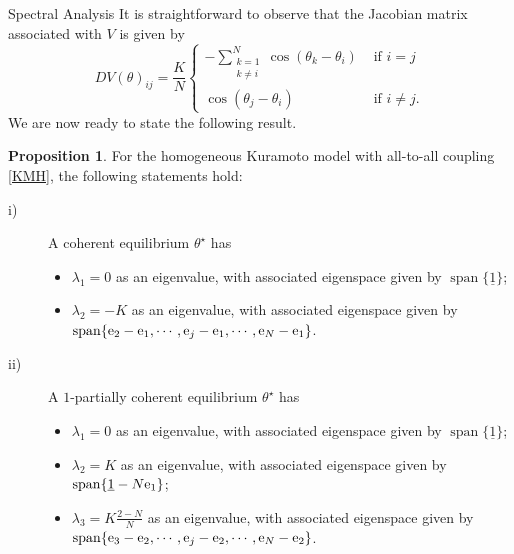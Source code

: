 \documentclass{article}
\theoremstyle{definition}
\newtheorem{proposition}[definition]{Proposition}
\newcommand{\e}{\textnormal{e}}
\begin{document}
\begin{section}{Spectral Analysis}
It is straightforward to observe that the Jacobian matrix associated with $V$ is given by
\begin{equation}\label{gen_jacobian}
    DV(\theta)_{i j}= \frac{K}{N}\begin{cases}\displaystyle-\sum_{\substack{k=1 \\ k \neq i}}^N \cos \left(\theta_k-\theta_i\right) & \text { if } i=j \\ \cos \left(\theta_j-\theta_i\right) & \text { if } i \neq j.\end{cases}
\end{equation}
We are now ready to state the following result.

\begin{proposition}\label{prop_spectral}
    For the homogeneous Kuramoto model with all-to-all coupling \eqref{KMH}, the following statements hold:
    \begin{description}
        \item[i)] A coherent equilibrium $\theta^\star$ has
        \begin{itemize}
            \item[$\bullet$] $\lambda_1=0$ as an eigenvalue, with associated eigenspace given by $\operatorname{span}\{\underline{1}\}$;
            \item[$\bullet$] $\lambda_2=-K$ as an eigenvalue, with associated eigenspace given by $\operatorname{span}\{\e_2-\e_1,\cdots,\e_j-\e_1,\cdots,\e_N-\e_1\}$.
        \end{itemize}

        \item[ii)] A $1$-partially coherent equilibrium $\theta^\star$ has
        \begin{itemize}
            \item[$\bullet$] $\lambda_1=0$ as an eigenvalue, with associated eigenspace given by $\operatorname{span}\{\underline{1}\}$;
            \item[$\bullet$] $\lambda_2=K$ as an eigenvalue, with associated eigenspace given by $\operatorname{span}\{\underline{1}-N\e_1\}$;
            \item[$\bullet$] $\lambda_3=K\frac{2-N}{N}$ as an eigenvalue, with associated eigenspace given by $\operatorname{span}\{\e_3-\e_2,\cdots,\e_j-\e_2,\cdots,\e_N-\e_2\}$.
        \end{itemize}


\end{description}
\end{proposition}
\end{section}
\end{document}
